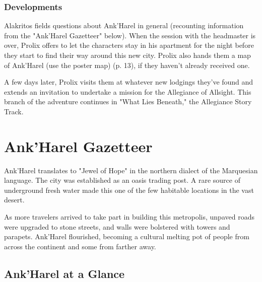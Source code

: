 \documentclass[letterpaper, 11pt, bg=full, twocolumn]{dndbook}
\begin{document}
\subsubsection{Developments}

Alakritos fields questions about Ank'Harel in general (recounting information from the "Ank'Harel Gazetteer" below). When the session with the headmaster is over, Prolix offers to let the characters stay in his apartment for the night before they start to find their way around this new city. Prolix also hands them a map of Ank'Harel (use the poster map) (p. 13), if they haven't already received one.

A few days later, Prolix visits them at whatever new lodgings they've found and extends an invitation to undertake a mission for the Allegiance of Allsight. This branch of the adventure continues in "What Lies Beneath," the Allegiance Story Track.
\section{Ank'Harel Gazetteer}

Ank'Harel translates to "Jewel of Hope" in the northern dialect of the Marquesian language. The city was established as an oasis trading post. A rare source of underground fresh water made this one of the few habitable locations in the vast desert.

As more travelers arrived to take part in building this metropolis, unpaved roads were upgraded to stone streets, and walls were bolstered with towers and parapets. Ank'Harel flourished, becoming a cultural melting pot of people from across the continent and some from farther away.

\subsection{Ank'Harel at a Glance}
\end{document}
